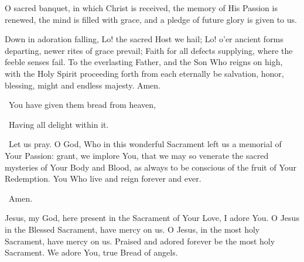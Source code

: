 O sacred banquet, in which Christ is received, the memory of His Passion is renewed, the mind is filled with grace, and a pledge of future glory is given to us.

Down in adoration falling,
Lo! the sacred Host we hail;
Lo! o'er ancient forms departing,
newer rites of grace prevail;
Faith for all defects supplying,
where the feeble senses fail.
To the everlasting Father,
and the Son Who reigns on high,
with the Holy Spirit proceeding
forth from each eternally
be salvation, honor, blessing,
might and endless majesty.
Amen.

\versicle\ You have given them bread from heaven,

\response\ Having all delight within it.

\versicle\ Let us pray.
O God, Who in this wonderful Sacrament left us a memorial of Your Passion:
grant, we implore You, that we may so venerate the sacred mysteries of Your Body and Blood, as always to be conscious of the fruit of Your Redemption.
You Who live and reign forever and ever.

\response\ Amen.

Jesus, my God, here present in the Sacrament of Your Love, I adore You. 
O Jesus in the Blessed Sacrament, have mercy on us. 
O Jesus, in the most holy Sacrament, have mercy on us. 
Praised and adored forever be the most holy Sacrament. 
We adore You, true Bread of angels. 

\newpage